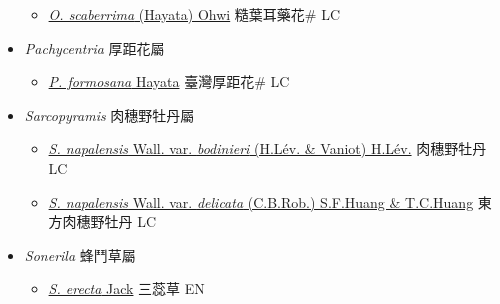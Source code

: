 \begin{itemize}
  \begin{itemize}
        \item[] \href{http://www.theplantlist.org/tpl1.1/search?q=Otanthera+scaberrima}{\textit{O. scaberrima} (Hayata) Ohwi}   糙葉耳藥花\# LC
  \end{itemize}
 \item[] \textit{Pachycentria} 厚距花屬
                    
  \begin{itemize}
        \item[] \href{http://www.theplantlist.org/tpl1.1/search?q=Pachycentria+formosana}{\textit{P. formosana} Hayata}   臺灣厚距花\# LC
  \end{itemize}
 \item[] \textit{Sarcopyramis} 肉穗野牡丹屬
                    
  \begin{itemize}
        \item[] \href{http://www.theplantlist.org/tpl1.1/search?q=Sarcopyramis+napalensis+var.+bodinieri}{\textit{S. napalensis} Wall. var. \textit{bodinieri} (H.Lév. \& Vaniot) H.Lév.}   肉穗野牡丹 LC
        \item[] \href{http://www.theplantlist.org/tpl1.1/search?q=Sarcopyramis+napalensis+var.+delicata}{\textit{S. napalensis} Wall. var. \textit{delicata} (C.B.Rob.) S.F.Huang \& T.C.Huang}   東方肉穗野牡丹 LC
  \end{itemize}
 \item[] \textit{Sonerila} 蜂鬥草屬
                    
  \begin{itemize}
        \item[] \href{http://www.theplantlist.org/tpl1.1/search?q=Sonerila+erecta}{\textit{S. erecta} Jack}     三蕊草 EN
  \end{itemize}
  \end{itemize}
